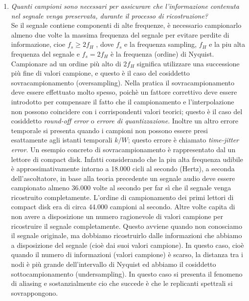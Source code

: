 \begin{enumerate}
    \item \textit{Quanti campioni sono necessari per assicurare che l’informazione
              contenuta nel segnale venga preservata, durante il processo di ricostruzione?}\\

          Se il segnale contiene componenti di alte frequenze, è necessario campionarlo almeno
          due volte la massima frequenza del segnale per evitare perdite di informazione,
          cioe $f_s \ge 2 f_H$ , dove $f_s$ e la frequenza sampling, $f_H$ e la piu alta
          frequenza del segnale e $f_s = 2 f_H$ è la frequenza (ordine) di Nyquist.
          Campionare ad un ordine più alto di $2 f_H$ significa utilizzare una successione
          più fine di valori campione, e questo è il caso del cosiddetto sovracampionamento (oversampling).
          Nella pratica il sovracampionamento deve essere effettuato molto spesso, poichè
          un fattore correttivo deve essere introdotto per compensare il fatto che il
          campionamento e l’interpolazione non possono coincidere con i corrispondenti valori
          teorici; questo è il caso del cosiddetto \textit{round-off error} o \textit{errore di
              quantizzazione}. Inoltre un altro errore temporale si presenta quando i campioni
          non possono essere presi esattamente agli istanti temporali $k/W$; questo errore è
          chiamato \textit{time-jitter error}.
          Un esempio concreto di sovracampionamento è rappresentato dal un lettore di compact disk.
          Infatti considerando che la piu alta frequenza
          udibile è approssimativamente intorno a 18.000 cicli al secondo (Hertz),
          a seconda dell’ascoltatore, in base alla teoria precedente un segnale audio
          deve essere campionato almeno 36.000 volte al secondo per far sì che
          il segnale venga ricostruito completamente. L’ordine di campionamento
          dei primi lettori di compact disk era di circa 44.000 campioni al secondo.
          Altre volte capita di non avere a disposizione un numero ragionevole di valori
          campione per ricostruire il segnale completamente. Questo
          avviene quando non conosciamo il segnale originale, ma dobbiamo ricostruirlo dalle
          informazioni che abbiamo a disposizione del segnale (cioè
          dai suoi valori campione). In questo caso, cioè quando il numero di
          informazioni (valori campione) è scarso, la distanza tra i nodi è più
          grande dell’intervallo di Nyquist ed abbiamo il cosiddetto sottocampionamento
          (undersampling). In questo caso si presenta il fenomeno di
          aliasing e sostanzialmente cio che succede è che le replicanti spettrali si
          sovrappongono.


\end{enumerate}
